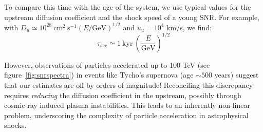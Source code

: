 To compare this time with the age of the system, we use typical values for the upstream diffusion coefficient and the shock speed of a young SNR. For example, with \( D_u \simeq 10^{28}~\text{cm}^2~\text{s}^{-1} (E/\text{GeV})^{1/2} \) and \( u_u = 10^4 \) km/s, we find:
%
\begin{equation}
\tau_{\text{acc}} \simeq 1~\text{kyr}~\left( \frac{E}{\text{GeV}} \right)^{1/2} 
\end{equation}

However, observations of particles accelerated up to 100 TeV (see figure~\ref{fig:snrspectra}) in events like Tycho's supernova (age \( \sim 500 \) years) suggest that our estimates are off by orders of magnitude! Reconciling this discrepancy requires \emph{reducing} the diffusion coefficient in the upstream, possibly through cosmic-ray induced plasma instabilities. This leads to an inherently non-linear problem, underscoring the complexity of particle acceleration in astrophysical shocks.